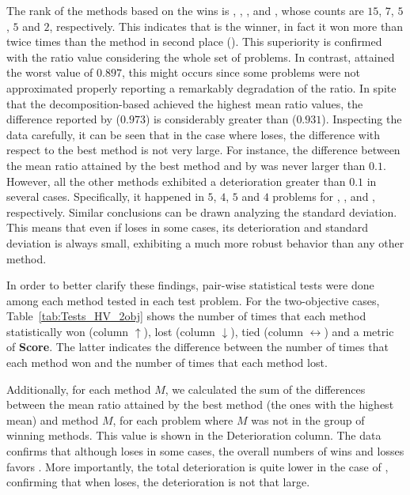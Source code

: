 The rank of the methods based on the wins is \VSDMOEAD{}, \RMOEA{}, \NSGAIII{}, \MOEADDE{} and \NSGAII{}, whose counts are $15$, $7$, $5$, $5$ and $2$, respectively.
%
This indicates that \VSDMOEAD{} is the winner, in fact it won more than twice times than the method in second place (\RMOEA{}).
%
This superiority is confirmed with the \HV{} ratio value considering the whole set of problems.
%
In contrast, \RMOEA{} attained the worst value of $0.897$, this might occurs since some problems were not approximated properly reporting a remarkably degradation of the \HV{} ratio.
%
In spite that the decomposition-based \MOEAS{} achieved the highest mean \HV{} ratio values, the difference reported by \VSDMOEAD{} ($0.973$) is considerably greater than \MOEADDE{} ($0.931$).
%
Inspecting the data carefully, it can be seen that in the case where \VSDMOEAD{} loses, the difference with respect to the best method is not very large.
%
For instance, the difference between the mean \HV{} ratio attained by the best method and by \VSDMOEAD{} was never larger than $0.1$.
%
However, all the other methods exhibited a deterioration greater than $0.1$ in several cases.
%
Specifically, it happened in $5$, $4$, $5$ and $4$ problems for \RMOEA{}, \NSGAII{}, \NSGAIII{} and \MOEADDE{}, respectively.
%
Similar conclusions can be drawn analyzing the standard deviation.
%
This means that even if \VSDMOEAD{} loses in some cases, its deterioration and standard deviation is always small, exhibiting a much more robust behavior than any other method.


In order to better clarify these findings, pair-wise statistical tests were done among each method tested in each test problem.
%
For the two-objective cases, Table~\ref{tab:Tests_HV_2obj} shows the number of times that each method statistically won (column $\uparrow$), lost (column $\downarrow$), tied (column $\leftrightarrow$) and a metric of \textbf{Score}.
%
The latter indicates the difference between the number of times that each method won and the number of times that each method lost.

%
Additionally, for each method $M$, we calculated the sum of the differences between the mean \HV{} ratio attained by the best method (the ones with the highest mean) and method $M$, for each problem where $M$ was not in the group of winning methods.
%
This value is shown in the Deterioration column.
%
The data confirms that although \VSDMOEAD{} loses in some cases, the overall numbers of wins and losses favors \VSDMOEAD{}.
%
More importantly, the total deterioration is quite lower in the case of \VSDMOEAD{}, confirming that when \VSDMOEAD{} loses, the deterioration is not that large.

